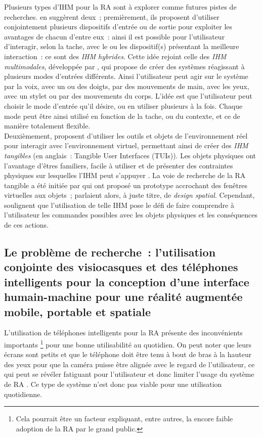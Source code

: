 Plusieurs types d'IHM pour la RA sont à explorer comme futures pistes de recherches. \citet{AzumaBaillotBehringerEtAl2001} en suggèrent deux~; premièrement, ils proposent d'utiliser conjointement plusieurs dispositifs d'entrée ou de sortie pour exploiter les avantages de chacun d'entre eux~: ainsi il est possible pour l'utilisateur d'interagir, selon la tache, avec le ou les dispositif(s) présentant la meilleure interaction~: ce sont des \emph{IHM hybrides}. \citep{ZhouDuhBillinghurst2008}  Cette idée rejoint celle des \emph{IHM multimodales}, développée par \citet{Oviatt2003}, qui propose de créer des systèmes réagissant à plusieurs modes d'entrées différents. Ainsi l'utilisateur peut agir sur le système par la voix, avec un ou des doigts, par des mouvements de main, avec les yeux, avec un stylet ou par des mouvements du corps. L'idée est que l'utilisateur peut choisir le mode d'entrée qu'il désire, ou en utiliser plusieurs à la fois. Chaque mode peut être ainsi utilisé en fonction de la tache, ou du contexte, et ce de manière totalement flexible. \citep{CarmignianiFurhtAnisettiEtAl2011} \\
Deuxièmement, \citet{AzumaBaillotBehringerEtAl2001} proposent d'utiliser les outils et objets de l'environnement réel pour interagir avec l'environnement virtuel, permettant ainsi de créer des \emph{IHM tangibles} (en anglais~: \foreignlanguage{english}{Tangible User Interfaces (TUIs)}). Les objets physiques ont l'avantage d'êtres familiers, facile à utiliser et de présenter des contraintes physiques sur lesquelles l'IHM peut s'appuyer \citep{ZhouDuhBillinghurst2008}. La voie de recherche de la RA tangible a été initiée par \citet{FeinerMacIntyreHauptEtAl1993} qui ont proposé un prototype accrochant des fenêtres virtuelles aux objets~; \citeauthor{FeinerMacIntyreHauptEtAl1993} parlaient alors, à juste titre, de \emph{design spatial}. Cependant, \citeauthor{ZhouDuhBillinghurst2008} soulignent que l'utilisation de telle IHM pose le défi de faire comprendre à l'utilisateur les commandes possibles avec les objets physiques et les conséquences de ces actions.


\subsection*{Le problème de recherche~: l'utilisation conjointe des visiocasques et des téléphones intelligents pour la conception d'une interface humain-machine pour une réalité augmentée mobile, portable et spatiale}
L'utilisation de téléphones intelligents pour la RA présente des inconvénients importants \footnote{Cela pourrait être un facteur expliquant, entre autres, la encore faible adoption de la RA par le grand public.} pour une bonne utilisabilité au quotidien. On peut noter que leurs écrans sont petits \citep{DeSaChurchill2013} et que le téléphone doit être tenu à bout de bras à la hauteur des yeux pour que la caméra puisse être alignée avec le regard de l'utilisateur, ce qui peut se révéler fatiguant pour l'utilisateur et donc limiter l'usage du système de RA \citep{Hincapie-RamosGuoMoghadasianEtAl2014}. Ce type de système n'est donc pas viable pour une utilisation quotidienne.


